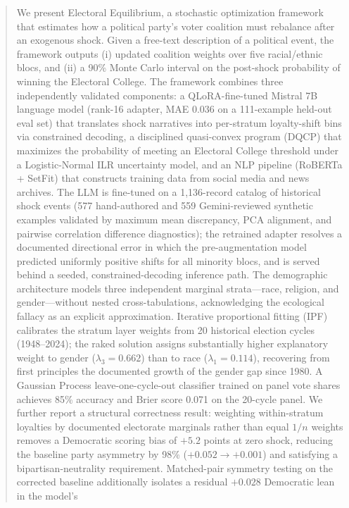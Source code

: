 \documentclass[12pt, letterpaper]{article}
\theoremstyle{definition}
\begin{document}
\begin{abstract}
We present Electoral Equilibrium, a stochastic optimization framework that estimates
how a political party's voter coalition must rebalance after an exogenous shock.
Given a free-text description of a political event, the framework outputs
(i) updated coalition weights over five racial/ethnic blocs, and
(ii) a 90\% Monte Carlo interval on the post-shock probability of winning the
Electoral College. The framework combines three independently validated components:
a QLoRA-fine-tuned Mistral 7B language model (rank-16 adapter, MAE 0.036 on a
111-example held-out eval set) that translates shock narratives into per-stratum
loyalty-shift bins via constrained decoding, a disciplined quasi-convex program
(DQCP) that maximizes the probability of meeting an Electoral College threshold
under a Logistic-Normal ILR uncertainty model, and an NLP pipeline (RoBERTa +
SetFit) that constructs training data from social media and news archives.
The LLM is fine-tuned on a 1,136-record catalog of historical shock events
(577 hand-authored and 559 Gemini-reviewed synthetic examples validated by
maximum mean discrepancy, PCA alignment, and pairwise correlation difference
diagnostics); the retrained adapter resolves a documented directional error in
which the pre-augmentation model predicted uniformly positive shifts for all
minority blocs, and is served behind a seeded, constrained-decoding inference path.
The demographic architecture models three independent marginal strata---race,
religion, and gender---without nested cross-tabulations, acknowledging the
ecological fallacy as an explicit approximation. Iterative proportional fitting
(IPF) calibrates the stratum layer weights from 20 historical election cycles
(1948--2024); the raked solution assigns substantially higher explanatory weight
to gender ($\lambda_3 = 0.662$) than to race ($\lambda_1 = 0.114$), recovering
from first principles the documented growth of the gender gap since 1980.
A Gaussian Process leave-one-cycle-out classifier trained on panel vote shares
achieves 85\% accuracy and Brier score 0.071 on the 20-cycle panel.
We further report a structural correctness result: weighting within-stratum
loyalties by documented electorate marginals rather than equal $1/n$ weights
removes a Democratic scoring bias of $+5.2$ points at zero shock, reducing the
baseline party asymmetry by 98\% ($+0.052 \rightarrow +0.001$) and satisfying a
bipartisan-neutrality requirement. Matched-pair symmetry testing on the corrected
baseline additionally isolates a residual $+0.028$ Democratic lean in the model's

\end{abstract}
\end{document}
